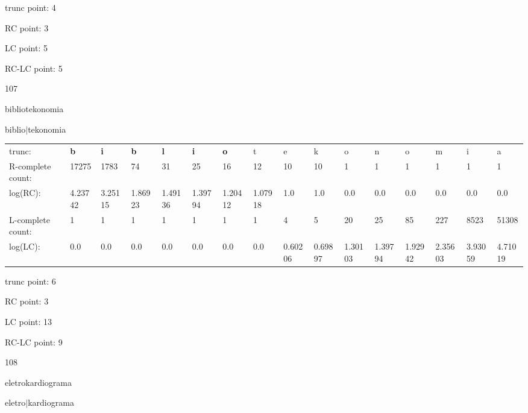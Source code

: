 \documentclass{article}
\begin{document}
trunc point: 4

RC point: 3

LC point: 5

RC-LC point: 5

\vspace{3em}



107

bibliotekonomia

biblio$|$tekonomia

\vspace{1em}

\begin{tabular}{l|lllllllllllllll}

trunc: & {\color{red}\bf b} & {\color{red}\bf i} & {\color{red}\bf b} & {\color{red}\bf l} & {\color{red}\bf i} & {\color{red}\bf o} & t & e & k & o & n & o & m & i & a \\ 
R-complete count: & 17275 & 1783 & 74 & 31 & 25 & 16 & 12 & 10 & 10 & 1 & 1 & 1 & 1 & 1 & 1 \\ 
log(RC): & 4.23742 & 3.25115 & 1.86923 & 1.49136 & 1.39794 & 1.20412 & 1.07918 & 1.0 & 1.0 & 0.0 & 0.0 & 0.0 & 0.0 & 0.0 & 0.0 \\ 
L-complete count: & 1 & 1 & 1 & 1 & 1 & 1 & 1 & 4 & 5 & 20 & 25 & 85 & 227 & 8523 & 51308 \\ 
log(LC): & 0.0 & 0.0 & 0.0 & 0.0 & 0.0 & 0.0 & 0.0 & 0.60206 & 0.69897 & 1.30103 & 1.39794 & 1.92942 & 2.35603 & 3.93059 & 4.71019 \\ 
\end{tabular}

trunc point: 6

RC point: 3

LC point: 13

RC-LC point: 9

\vspace{3em}



108

eletrokardiograma

eletro$|$kardiograma

\vspace{1em}
\end{document}
